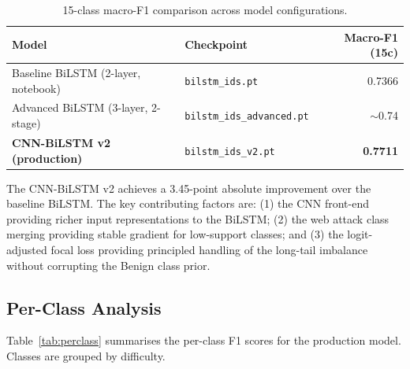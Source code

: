\documentclass[12pt]{article}
\theoremstyle{plain}
\begin{document}
\begin{table}[H]
\centering
\caption{15-class macro-F1 comparison across model configurations.}
\label{tab:results}
\begin{tabular}{llr}
\toprule
\textbf{Model} & \textbf{Checkpoint} & \textbf{Macro-F1 (15c)} \\
\midrule
\rowcolor{lightgray}
Baseline BiLSTM (2-layer, notebook) & \texttt{bilstm\_ids.pt} & 0.7366 \\
Advanced BiLSTM (3-layer, 2-stage) & \texttt{bilstm\_ids\_advanced.pt} & $\sim$0.74 \\
\rowcolor{lightgray}
\textbf{CNN-BiLSTM v2 (production)} & \texttt{bilstm\_ids\_v2.pt} & \textbf{0.7711} \\
\bottomrule
\end{tabular}
\end{table}

The CNN-BiLSTM v2 achieves a 3.45-point absolute improvement over the baseline BiLSTM. The key contributing factors are: (1) the CNN front-end providing richer input representations to the BiLSTM; (2) the web attack class merging providing stable gradient for low-support classes; and (3) the logit-adjusted focal loss providing principled handling of the long-tail imbalance without corrupting the Benign class prior.

\subsection{Per-Class Analysis}

Table~\ref{tab:perclass} summarises the per-class F1 scores for the production model. Classes are grouped by difficulty.
\end{document}
